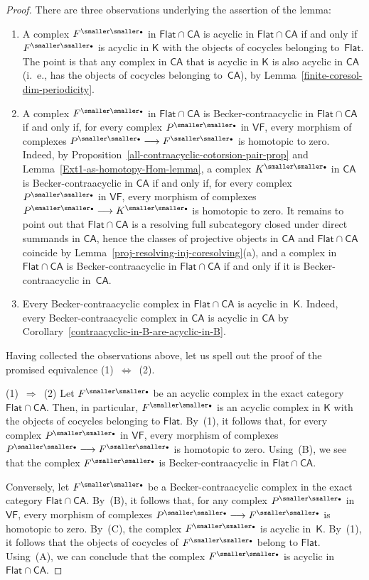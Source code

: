 \documentclass[12pt,a4paper]{amsart}
\newcommand{\+}{\nobreakdash-}
\renewcommand{\:}{\colon}
\newcommand{\rarrow}{\longrightarrow}
\newcommand{\bu}{{\text{\smaller\smaller$\scriptstyle\bullet$}}}
\newcommand{\sK}{\mathsf K}
\newcommand{\VF}{\mathsf{VF}}
\newcommand{\CA}{\mathsf{CA}}
\newcommand{\Flat}{\mathsf{Flat}}
\theoremstyle{plain}
\theoremstyle{definition}
\begin{document}
\begin{proof}
 There are three observations underlying the assertion of the lemma:
\begin{enumerate}
\renewcommand{\theenumi}{\Alph{enumi}}
\item A complex $F^\bu$ in $\Flat\cap\CA$ is acyclic in
$\Flat\cap\CA$ if and only if $F^\bu$ is acyclic in $\sK$ with
the objects of cocycles belonging to~$\Flat$.
 The point is that any complex in $\CA$ that is acyclic in $\sK$ is
also acyclic in $\CA$ (i.~e., has the objects of cocycles belonging
to~$\CA$), by Lemma~\ref{finite-coresol-dim-periodicity}.
\item A complex $F^\bu$ in $\Flat\cap\CA$ is Becker-contraacyclic
in $\Flat\cap\CA$ if and only if, for every complex $P^\bu$ in $\VF$,
every morphism of complexes $P^\bu\rarrow F^\bu$ is homotopic to zero.
 Indeed, by Proposition~\ref{all-contraacyclic-cotorsion-pair-prop} and
Lemma~\ref{Ext1-as-homotopy-Hom-lemma}, a complex $K^\bu$ in $\CA$ is
Becker-contraacyclic in $\CA$ if and only if, for every complex $P^\bu$
in $\VF$, every morphism of complexes $P^\bu\rarrow K^\bu$ is homotopic
to zero.
 It remains to point out that $\Flat\cap\CA$ is a resolving full
subcategory closed under direct summands in $\CA$, hence the classes of
projective objects in $\CA$ and $\Flat\cap\CA$ coincide by
Lemma~\ref{proj-resolving-inj-coresolving}(a), and a complex in
$\Flat\cap\CA$ is Becker-contraacyclic in $\Flat\cap\CA$ if and only
if it is Becker-contraacyclic in~$\CA$.
\item Every Becker-contraacyclic complex in $\Flat\cap\CA$ is
acyclic in~$\sK$.
 Indeed, every Becker-contraacyclic complex in $\CA$ is acyclic in
$\CA$ by Corollary~\ref{contraacyclic-in-B-are-acyclic-in-B}.
\end{enumerate}

 Having collected the observations above, let us spell out the proof
of the promised equivalence (1)~$\Longleftrightarrow$~(2).

 (1)~$\Longrightarrow$~(2) Let $F^\bu$ be an acyclic complex in
the exact category $\Flat\cap\CA$.
 Then, in particular, $F^\bu$ is an acyclic complex in $\sK$ with
the objects of cocycles belonging to $\Flat$.
 By~(1), it follows that, for every complex $P^\bu$ in $\VF$,
every morphism of complexes $P^\bu\rarrow F^\bu$ is homotopic to zero.
 Using~(B), we see that the complex $F^\bu$ is Becker-contraacyclic
in $\Flat\cap\CA$.

 Conversely, let $F^\bu$ be a Becker-contraacyclic complex in
the exact category $\Flat\cap\CA$.
 By~(B), it follows that, for any complex $P^\bu$ in $\VF$, every
morphism of complexes $P^\bu\rarrow F^\bu$ is homotopic to zero.
 By~(C), the complex $F^\bu$ is acyclic in~$\sK$.
 By~(1), it follows that the objects of cocycles of $F^\bu$ belong
to $\Flat$.
 Using~(A), we can conclude that the complex $F^\bu$ is acyclic
in $\Flat\cap\CA$.


\end{proof}
\end{document}
